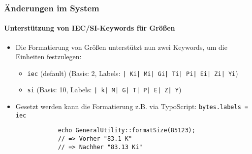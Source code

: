 
\begin{frame}[fragile]
	\frametitle{Änderungen im System}
	\framesubtitle{Unterstützung von IEC/SI-Keywords für Größen}


	\begin{itemize}

		\item Die Formatierung von Größen unterstützt nun zwei Keywords, um die Einheiten festzulegen:

			\begin{itemize}
				\item \small\texttt{iec} (default)\newline
					\small(Basis: 2, Labels: \texttt{| Ki| Mi| Gi| Ti| Pi| Ei| Zi| Yi})\normalsize
				\item \small\texttt{si}\newline
					\small(Basis: 10, Labels: \texttt{| k| M| G| T| P| E| Z| Y})\normalsize
			\end{itemize}

		\item Gesetzt werden kann die Formatierung z.B. via TypoScript:\newline
			\texttt{bytes.labels = iec}

		\begin{lstlisting}
			echo GeneralUtility::formatSize(85123);
			// => Vorher "83.1 K"
			// => Nachher "83.13 Ki"
		\end{lstlisting}

	\end{itemize}

\end{frame}


